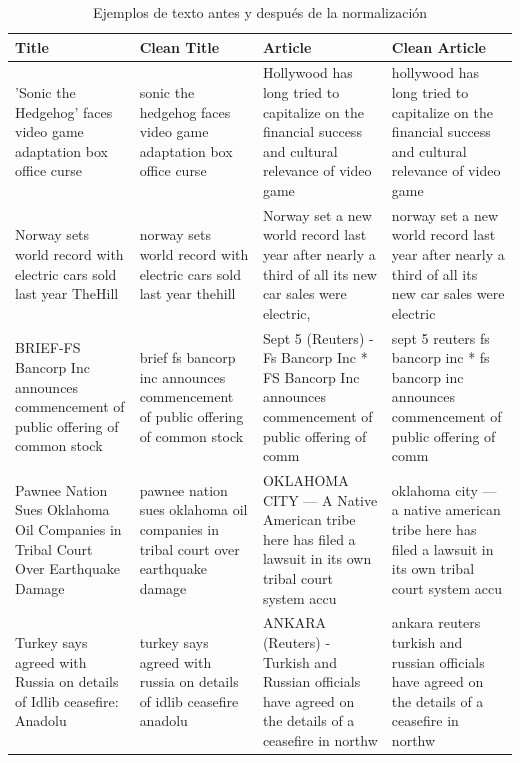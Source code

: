 \documentclass[11pt, a4paper]{article}
\begin{document}
\begin{table}[h]
    \centering
    \small
    \begin{tabularx}{\textwidth}{@{}>{\raggedright\arraybackslash}X >{\raggedright\arraybackslash}X >{\raggedright\arraybackslash}X >{\raggedright\arraybackslash}X@{}}
        \toprule
        \textbf{Title} & \textbf{Clean Title} & \textbf{Article} & \textbf{Clean Article} \\
        \midrule
        'Sonic the Hedgehog' faces video game adaptation box office curse & sonic the hedgehog faces video game adaptation box office curse & Hollywood has long tried to capitalize on the financial success and cultural relevance of video game & hollywood has long tried to capitalize on the financial success and cultural relevance of video game \\
        Norway sets world record with electric cars sold last year \textbar{} TheHill & norway sets world record with electric cars sold last year \textbar{} thehill & Norway set a new world record last year after nearly a third of all its new car sales were electric, & norway set a new world record last year after nearly a third of all its new car sales were electric \\
        BRIEF-FS Bancorp Inc announces commencement of public offering of common stock & brief fs bancorp inc announces commencement of public offering of common stock & Sept 5 (Reuters) - Fs Bancorp Inc * FS Bancorp Inc announces commencement of public offering of comm & sept 5 reuters fs bancorp inc * fs bancorp inc announces commencement of public offering of comm \\
        Pawnee Nation Sues Oklahoma Oil Companies in Tribal Court Over Earthquake Damage & pawnee nation sues oklahoma oil companies in tribal court over earthquake damage & OKLAHOMA CITY — A Native American tribe here has filed a lawsuit in its own tribal court system accu & oklahoma city — a native american tribe here has filed a lawsuit in its own tribal court system accu \\
        Turkey says agreed with Russia on details of Idlib ceasefire: Anadolu & turkey says agreed with russia on details of idlib ceasefire anadolu & ANKARA (Reuters) - Turkish and Russian officials have agreed on the details of a ceasefire in northw & ankara reuters turkish and russian officials have agreed on the details of a ceasefire in northw \\
        \bottomrule
    \end{tabularx}
    \caption{Ejemplos de texto antes y después de la normalización}
    \label{tab:normalization_examples}
\end{table}
\end{document}

